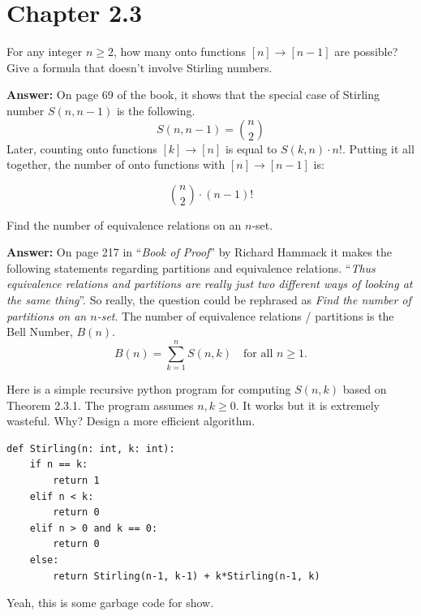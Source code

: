 \documentclass{article}
\begin{document}
\section{Chapter 2.3}
\setcounter{problem}{1}
\begin{problem} %
For any integer $n \ge 2$, how many onto functions $[n] \rightarrow [n-1]$ are possible? Give a formula that doesn't involve Stirling numbers.
\end{problem}

\textbf{Answer:}
On page 69 of the book, it shows that the special case of Stirling number $S(n, n-1)$ is the following.
\begin{equation*}
    S(n, n-1) = \binom{n}{2}
\end{equation*}
Later, counting onto functions $[k] \rightarrow [n]$ is equal to $S(k,n) \cdot n!$. Putting it all together, the number of onto functions with $[n] \rightarrow [n-1]$ is:

\begin{equation*}
    \binom{n}{2} \cdot (n-1)!
\end{equation*}


\setcounter{problem}{6}
\begin{problem} %
Find the number of equivalence relations on an $n$-set.
\end{problem}

\textbf{Answer:}
On page 217 in ``\textit{Book of Proof}'' by Richard Hammack it makes the following statements regarding partitions and equivalence relations. ``\textit{Thus equivalence relations and partitions are really just two different ways of looking at the same thing}''. So really, the question could be rephrased as \textit{Find the number of partitions on an $n$-set}. The number of equivalence relations / partitions is the Bell Number, $B(n)$.
\begin{equation*}
    B(n) = \sum_{k=1}^{n} S(n,k) \quad \text{for all } n \ge 1. 
\end{equation*}

\setcounter{problem}{13}
\begin{problem} %
Here is a simple recursive python program for computing $S(n,k)$ based on Theorem 2.3.1. The program assumes $n,k \ge 0$. It works but it is extremely wasteful. Why? Design a more efficient algorithm.
\begin{verbatim}
def Stirling(n: int, k: int):
    if n == k:
        return 1
    elif n < k:
        return 0
    elif n > 0 and k == 0:
        return 0
    else:
        return Stirling(n-1, k-1) + k*Stirling(n-1, k)
\end{verbatim}
\end{problem}
Yeah, this is some garbage code for show.
\end{document}
